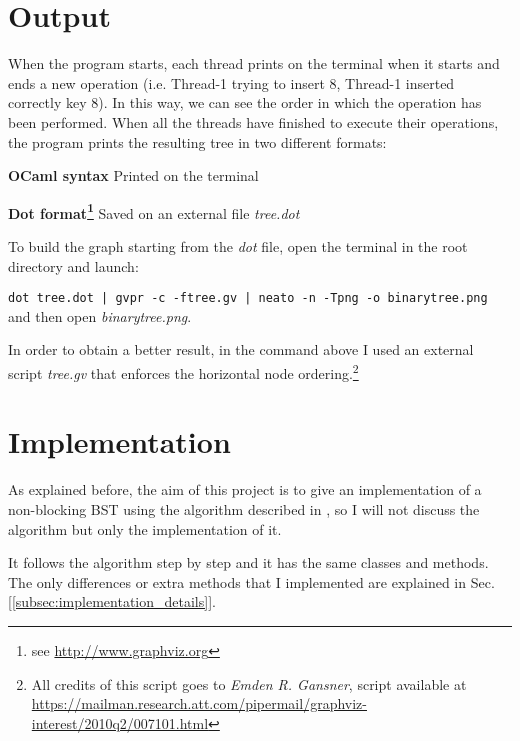 \documentclass[a4paper]{article}
\begin{document}

\section{Output}
\label{sec:output}
When the program starts, each thread prints on the terminal when it starts and ends a new operation (i.e. Thread-1 trying to insert 8, Thread-1 inserted correctly key 8). In this way, we can see the order in which the operation has been performed.
When all the threads have finished to execute their operations, the program prints the resulting tree in two different formats:
\begin{compactitem}
  \item \textbf{OCaml syntax} Printed on the terminal
  \item \textbf{Dot format\footnote{see \url{http://www.graphviz.org}}} Saved on an external file \emph{tree.dot}
\end{compactitem}

\noindent
To build the graph starting from the \emph{dot} file, open the terminal in the root directory and launch:

\verb!dot tree.dot | gvpr -c -ftree.gv | neato -n -Tpng -o binarytree.png!
\\
\noindent
and then open \emph{binarytree.png}. 

In order to obtain a better result, in the command above I used an external script \emph{tree.gv} that enforces the horizontal node ordering.\footnote{All credits of this script goes to \emph{Emden R. Gansner}, script available at \url{https://mailman.research.att.com/pipermail/graphviz-interest/2010q2/007101.html}}


\section{Implementation} %
\label{sec:implementation}
As explained before, the aim of this project is to give an implementation of a non-blocking \ac{BST} using the algorithm described in \cite{algorithm}, so I will not discuss the algorithm but only the implementation of it.

It follows the algorithm step by step and it has the same classes and methods. The only differences or extra methods that I implemented are explained in Sec.[\ref{subsec:implementation_details}].
\end{document}
